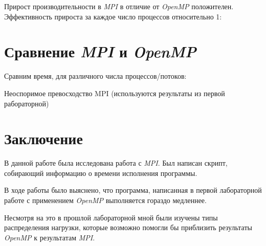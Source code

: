 \documentclass[a4paper, 12pt]{article}
\begin{document}
\vspace{0.3cm}

Прирост производительности в \textit{MPI} в отличие от \textit{OpenMP} положителен. Эффективность прироста за каждое число процессов относительно 1:




\section{Сравнение \textit{MPI} и \textit{OpenMP}}

Сравним время, для различного числа процессов/потоков:

\vspace{0.3cm}


Неоспоримое превосходство MPI (используются результаты из первой рабораторной)


\section{Заключение}
В данной работе была исследована работа с \textit{MPI}. Был написан скрипт, собирающий информацию о времени исполнения программы.

В ходе работы было выяснено, что программа, написанная в первой лабораторной работе с применением \textit{OpenMP} выполняется гораздо медленнее.

Несмотря на это в прошлой лабораторной мной были изучены типы распределения нагрузки, которые возможно помогли бы приблизить результаты \textit{OpenMP} к результатам \textit{MPI}.
\end{document}
